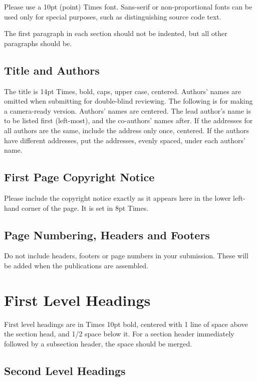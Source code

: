 \documentclass{article}
\begin{document}
Please use a 10pt (point) Times font. Sans-serif or non-proportional fonts
can be used only for special purposes, such as distinguishing source code text.

The first paragraph in each section should not be indented, but all other paragraphs should be.

\subsection{Title and Authors}

The title is 14pt Times, bold, caps, upper case, centered.
Authors' names are omitted when submitting for double-blind reviewing.
The following is for making a camera-ready version.
Authors' names are centered.
The lead author's name is to be listed first (left-most), and the co-authors' names after.
If the addresses for all authors are the same, include the address only once, centered.
If the authors have different addresses, put the addresses, evenly spaced, under each authors' name.

\subsection{First Page Copyright Notice}

Please include the copyright notice exactly as it appears here in the lower left-hand corner of the page.
It is set in 8pt Times.

\subsection{Page Numbering, Headers and Footers}

Do not include headers, footers or page numbers in your submission.
These will be added when the publications are assembled.

\section{First Level Headings}

First level headings are in Times 10pt bold,
centered with 1 line of space above the section head, and 1/2 space below it.
For a section header immediately followed by a subsection header, the space should be merged.

\subsection{Second Level Headings}
\end{document}
